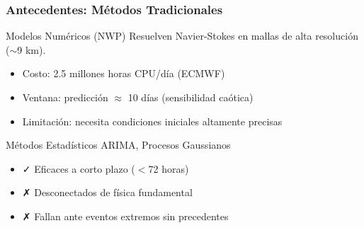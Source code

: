 \begin{frame}[fragile,shrink=5]
  \frametitle{Antecedentes: Métodos Tradicionales}
  
  \begin{block}{Modelos Numéricos (NWP)}
    Resuelven Navier-Stokes en mallas de alta resolución ($\sim$9 km).
    \begin{itemize}
      \item Costo: 2.5 millones horas CPU/día (ECMWF)
      \item Ventana: predicción $\approx$ 10 días (sensibilidad caótica)
      \item Limitación: necesita condiciones iniciales altamente precisas
    \end{itemize}
  \end{block}
  
  \begin{block}{Métodos Estadísticos}
    ARIMA, Procesos Gaussianos
    \begin{itemize}
      \item \textcolor{ColorVerdeOliva}{✓ Eficaces a corto plazo ($<$72 horas)}
      \item \textcolor{ColorRojoVino}{✗ Desconectados de física fundamental}
      \item \textcolor{ColorRojoVino}{✗ Fallan ante eventos extremos sin precedentes}
    \end{itemize}
  \end{block}
  
\end{frame}

